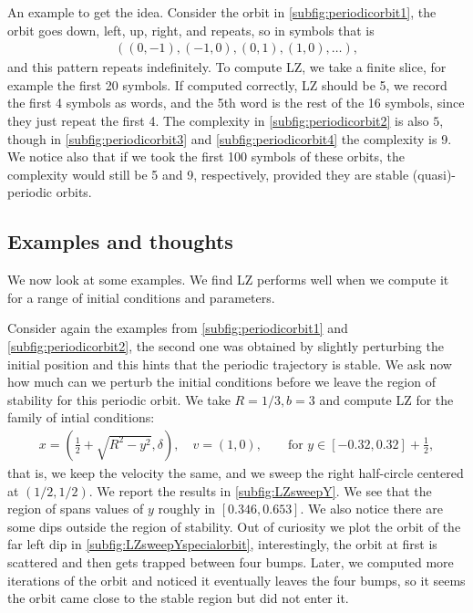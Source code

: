 An example to get the idea. Consider the orbit in \cref{subfig:periodicorbit1}, the orbit goes down, left, up, right, and repeats, so in symbols that is
\begin{align*}
((0,-1),(-1,0),(0,1),(1,0),\dots),
\end{align*}
and this pattern repeats indefinitely. To compute LZ, we take a finite slice, for example the first 20 symbols. If computed correctly, LZ should be 5, we record the first 4 symbols as words, and the 5th word is the rest of the 16 symbols, since they just repeat the first 4. The complexity in \cref{subfig:periodicorbit2} is also $5$, though in \cref{subfig:periodicorbit3} and \cref{subfig:periodicorbit4} the complexity is 9. We notice also that if we took the first 100 symbols of these orbits, the complexity would still be 5 and 9, respectively, provided they are stable (quasi)-periodic orbits.

\subsection{Examples and thoughts}

We now look at some examples. We find LZ performs well when we compute it for a range of initial conditions and parameters.

Consider again the examples from \cref{subfig:periodicorbit1} and \cref{subfig:periodicorbit2}, the second one was obtained by slightly perturbing the initial position and this hints that the periodic trajectory is stable. We ask now how much can we perturb the initial conditions before we leave the region of stability for this periodic orbit. We take $R=1/3, b=3$ and compute LZ for the family of intial conditions:
\begin{align*}
x= \left(\frac{1}{2}+\sqrt{R^2-y^2},\delta\right),\quad v = \left(1,0\right),\qquad \text{for } y\in [-0.32,0.32]+\frac{1}{2},
\end{align*} 
that is, we keep the velocity the same, and we sweep the right half-circle centered at $(1/2, 1/2)$. We report the results in \cref{subfig:LZsweepY}. We see that the region of spans values of $y$ roughly in $[0.346, 0.653]$. We also notice there are some dips outside the region of stability. Out of curiosity we plot the orbit of the far left dip in \cref{subfig:LZsweepYspecialorbit}, interestingly, the orbit at first is scattered and then gets trapped between four bumps. Later, we computed more iterations of the orbit and noticed it eventually leaves the four bumps, so it seems the orbit came close to the stable region but did not enter it.



